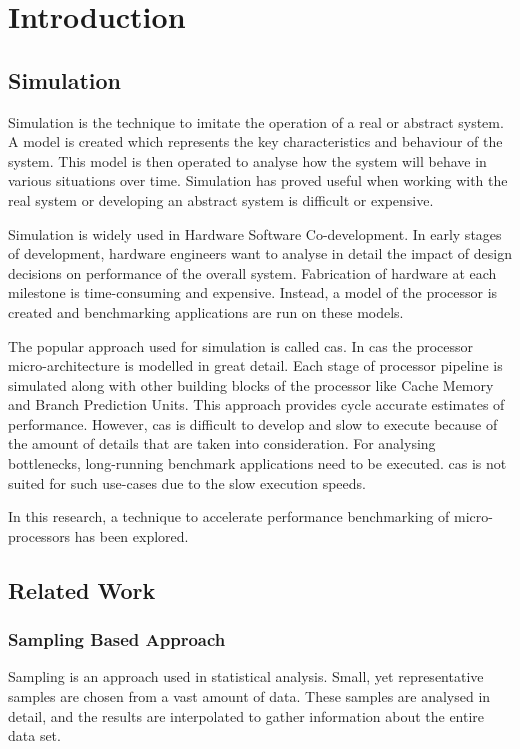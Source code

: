 \chapter{Introduction}\label{chapter:introduction}

\section{Simulation}

Simulation is the technique to imitate the operation of a real or abstract system. A model is created which represents the key characteristics and behaviour of the system. This model is then operated to analyse how the system will behave in various situations over time. Simulation has proved useful when working with the real system or developing an abstract system is difficult or expensive.

Simulation is widely used in Hardware Software Co-development. In early stages of development, hardware engineers want to analyse in detail the impact of design decisions on performance of the overall system. Fabrication of hardware at each milestone is time-consuming and expensive. Instead, a model of the processor is created and benchmarking applications are run on these models.

The popular approach used for simulation is called \gls{cas}. In \gls{cas} the processor micro-architecture is modelled in great detail. Each stage of processor pipeline is simulated along with other building blocks of the processor like Cache Memory and Branch Prediction Units. This approach provides cycle accurate estimates of performance. However, \gls{cas} is difficult to develop and slow to execute because of the amount of details that are taken into consideration. For analysing bottlenecks, long-running benchmark applications need to be executed. \gls{cas} is not suited for such use-cases due to the slow execution speeds.

In this research, a technique to accelerate performance benchmarking of micro-processors has been explored.

\section{Related Work}

\subsection{Sampling Based Approach}
Sampling is an approach used in statistical analysis. Small, yet representative samples are chosen from a vast amount of data. These samples are analysed in detail, and the results are interpolated to gather information about the entire data set.

